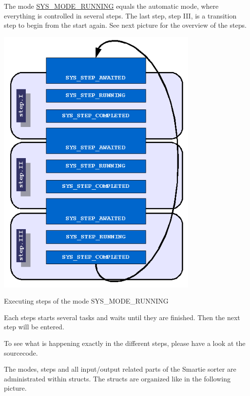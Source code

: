 The mode \hyperlink{system_8h_6e4cea4b6246f491c526211f5405627d564529220e61e848983d8eb9d7f87736}{SYS\_\-MODE\_\-RUNNING} equals the automatic mode, where everything is controlled in several steps. The last step, step III, is a transition step to begin from the start again. See next picture for the overview of the steps.

 \begin{Image}
\begin{center}
\includegraphics[width=10cm]{state-machine-steps.png}\caption{Executing steps of the mode SYS\_\-MODE\_\-RUNNING}
\end{center}
\end{Image}


Each steps starts several tasks and waits until they are finished. Then the next step will be entered.

To see what is happening exactly in the different steps, please have a look at the sourcecode.

The modes, steps and all input/output related parts of the Smartie sorter are administrated within structs. The structs are organized like in the following picture.


